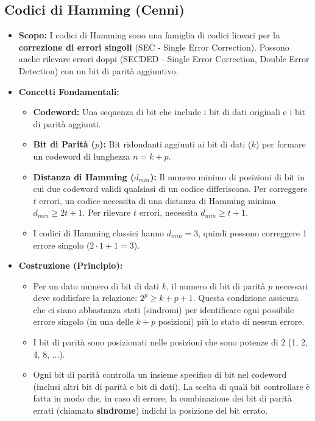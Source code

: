 \subsection{Codici di Hamming (Cenni)}
\begin{itemize}
    \item \textbf{Scopo:} I codici di Hamming sono una famiglia di codici lineari per la \textbf{correzione di errori singoli} (SEC - Single Error Correction). Possono anche rilevare errori doppi (SECDED - Single Error Correction, Double Error Detection) con un bit di parità aggiuntivo.
    \item \textbf{Concetti Fondamentali:}
    \begin{itemize}
        \item \textbf{Codeword:} Una sequenza di bit che include i bit di dati originali e i bit di parità aggiunti.
        \item \textbf{Bit di Parità ($p$):} Bit ridondanti aggiunti ai bit di dati ($k$) per formare un codeword di lunghezza $n = k+p$.
        \item \textbf{Distanza di Hamming ($d_{min}$):} Il numero minimo di posizioni di bit in cui due codeword validi qualsiasi di un codice differiscono. Per correggere $t$ errori, un codice necessita di una distanza di Hamming minima $d_{min} \ge 2t+1$. Per rilevare $t$ errori, necessita $d_{min} \ge t+1$.
        \item I codici di Hamming classici hanno $d_{min}=3$, quindi possono correggere 1 errore singolo ($2 \cdot 1 + 1 = 3$).
    \end{itemize}
    \item \textbf{Costruzione (Principio):}
    \begin{itemize}
        \item Per un dato numero di bit di dati $k$, il numero di bit di parità $p$ necessari deve soddisfare la relazione: $2^p \ge k + p + 1$. Questa condizione assicura che ci siano abbastanza stati (sindromi) per identificare ogni possibile errore singolo (in una delle $k+p$ posizioni) più lo stato di nessun errore.
        \item I bit di parità sono posizionati nelle posizioni che sono potenze di 2 (1, 2, 4, 8, ...).
        \item Ogni bit di parità controlla un insieme specifico di bit nel codeword (inclusi altri bit di parità e bit di dati). La scelta di quali bit controllare è fatta in modo che, in caso di errore, la combinazione dei bit di parità errati (chiamata \textbf{sindrome}) indichi la posizione del bit errato.

\end{itemize}
\end{itemize}
